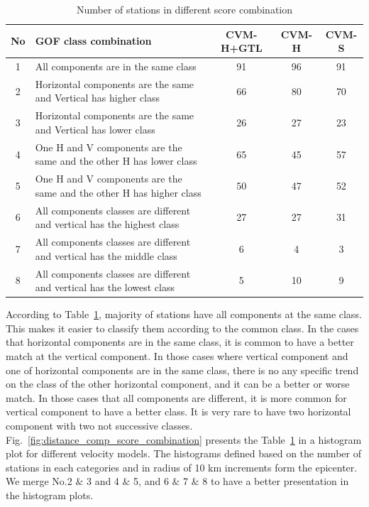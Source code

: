 \begin{table}
\centering
\caption{Number of stations in different score combination}
\begin{tabular}{clccc}
\hline
No & GOF class combination                                                                                   & CVM-H+GTL    & CVM-H     &  CVM-S              \\ \hline
1 & All components are in the same class                                                               &   91               & 96               &  91                    \\
2 & Horizontal components are the same and Vertical has higher class                 &   66               & 80               &  70                     \\
3 & Horizontal components are the same and Vertical has lower class                 &    26              &  27               &   23                 \\
4 & One H and V components are the same and the other H has lower class       &   65               &  45               &  57                   \\
5 & One H and V components are the same and the other H has higher class      &   50                & 47              &  52                    \\
6 & All components classes are different and vertical has the highest class           &    27             & 27                &  31                    \\
7 & All components classes are different and vertical has the middle class            &      6             & 4                   &  3                     \\
8 & All components classes are different and vertical has the lowest class            &      5              & 10                &   9                      \\ \hline

\end{tabular}
\label{tab:station_comp_cvm}
\end{table}

According to Table~\ref{tab:station_comp_cvm}, majority of stations have all components at the same class. This makes it easier to classify them according to the common class. In the cases that horizontal components are in the same class, it is common to have a better match at the vertical component. In those cases where vertical component and one of horizontal components are in the same class, there is no any specific trend on the class of the other horizontal component, and it can be a better or worse match.  In those cases that all components are different, it is more common for vertical component to have a better class. It is very rare to have two horizontal component with two not successive classes. Fig.~\ref{fig:distance_comp_score_combination} presents the  Table~\ref{tab:station_comp_cvm} in a histogram plot for different velocity models. The histograms defined based on the number of stations in each categories and in radius of 10 km increments form the epicenter. We merge No.2 $\&$ 3 and 4 $\&$ 5, and 6 $\&$ 7 $\&$ 8 to have a better presentation in the histogram plots.\\  

